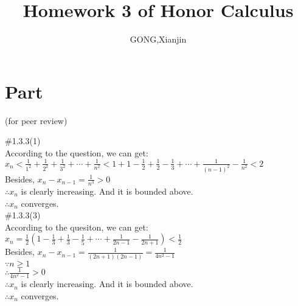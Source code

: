 \documentclass{article}
\author{GONG,Xianjin}
\title{Homework 3 of Honor Calculus}
\begin{document}
\maketitle

\section{\textcolor[rgb]{0.70,0.00,0.00}{Part \uppercase\expandafter{}}}(for peer review)

\vspace{3.5mm}

\textcolor[rgb]{0.00,0.00,0.50}{\#1.3.3(1)}\\

According to the question, we can get:\\

$\displaystyle x_n<\frac{1}{1^2}+\frac{1}{2^2}+\frac{1}{3^2}+\cdots+\frac{1}{n^2}<1+1-\frac{1}{2}+\frac{1}{2}-\frac{1}{3}+\cdots+\frac{1}{(n-1)^2}-\frac{1}{n^2}<2$\\

Besides, $\displaystyle x_n-x_{n-1}=\frac{1}{n^3}>0$\\

$\therefore$\qquad$x_n$ is clearly increasing. And it is bounded above.\\

$\therefore$\qquad$x_n$ converges.\\

\textcolor[rgb]{0.00,0.00,0.50}{\#1.3.3(3)}\\

According to the quesiton, we can get:\\

$\displaystyle x_n=\frac{1}{2}\left(1-\frac{1}{3}+\frac{1}{3}-\frac{1}{5}+\cdots+\frac{1}{2n-1}-\frac{1}{2n+1}\right)<\frac{1}{2}$\\

Besides, $\displaystyle x_n-x_{n-1}=\frac{1}{(2n+1)(2n-1)}=\frac{1}{4n^2-1}$\\

$\because$\qquad$n\geq1$\\

$\therefore$\qquad$\displaystyle \frac{1}{4n^2-1}>0 $\\

$\therefore$\qquad$x_n$ is clearly increasing. And it is bounded above.\\

$\therefore$\qquad$x_n$ converges.\\
\end{document}
